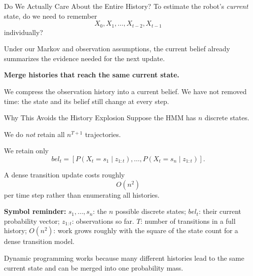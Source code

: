 \documentclass[aspectratio=169,10pt]{beamer}
\newcommand{\equationlegend}[1]{%
  \par\smallskip
  \begingroup
    \setlength{\fboxsep}{5pt}%
    \noindent\colorbox{DeckSoft}{%
      \parbox{\dimexpr\linewidth-2\fboxsep\relax}{%
        \footnotesize\textbf{Symbol reminder:} #1%
      }%
    }\par
  \endgroup
  \smallskip
}
\begin{document}
\begin{frame}[shrink=10]{Do We Actually Care About the Entire History?}
  To estimate the robot's \emph{current} state, do we need to remember
  \[
    X_0,X_1,\ldots,X_{t-2},X_{t-1}
  \]
  individually?

  Under our Markov and observation assumptions, the current belief already summarizes the evidence needed for the next update.

  \begin{center}
    \Large\textbf{Merge histories that reach the same current state.}
  \end{center}

  \begin{keyidea}
    We compress the observation history into a current belief. We have not removed time: the state and its belief still change at every step.
  \end{keyidea}
\end{frame}


\begin{frame}[shrink=10]{Why This Avoids the History Explosion}
  Suppose the HMM has $n$ discrete states.

  We do \emph{not} retain all $n^{T+1}$ trajectories.

  We retain only
  \[
    bel_t=[P(X_t=s_1\mid z_{1:t}),\ldots,P(X_t=s_n\mid z_{1:t})].
  \]

  A dense transition update costs roughly
  \[
    O(n^2)
  \]
  per time step rather than enumerating all histories.

  \equationlegend{$s_1,\ldots,s_n$: the $n$ possible discrete states; $bel_t$: their current probability vector; $z_{1:t}$: observations so far. $T$: number of transitions in a full history; $O(n^2)$: work grows roughly with the square of the state count for a dense transition model.}

  \begin{keyidea}
    Dynamic programming works because many different histories lead to the same current state and can be merged into one probability mass.
  \end{keyidea}
\end{frame}
\end{document}
